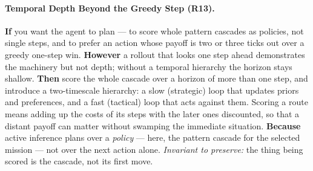 \hypertarget{pat-r13}{}\paragraph{Temporal Depth Beyond the Greedy Step (R13).}\label{pat:r13} \textbf{If} you want the agent to plan --- to score whole pattern cascades as policies, not single steps, and to prefer an action whose payoff is two or three ticks out over a greedy one-step win. \textbf{However} a rollout that looks one step ahead demonstrates the machinery but not depth; without a temporal hierarchy the horizon stays shallow. \textbf{Then} score the whole cascade over a horizon of more than one step, and introduce a two-timescale hierarchy: a slow (strategic) loop that updates priors and preferences, and a fast (tactical) loop that acts against them.  Scoring a route means adding up the costs of its steps with the later ones discounted, so that a distant payoff can matter without swamping the immediate situation. \textbf{Because} active inference plans over a \emph{policy} --- here, the pattern cascade for the selected mission --- not over the next action alone.  \emph{Invariant to preserve:} the thing being scored is the cascade, not its first move.

